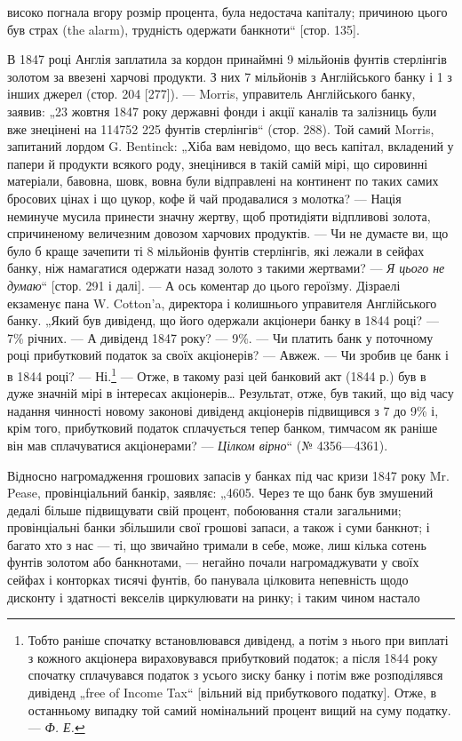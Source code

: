 \parcont{}  %
високо погнала вгору розмір процента, була недостача капіталу;
причиною цього був страх (the alarm), трудність одержати банкноти“ [стор. 135].

В 1847 році Англія заплатила за кордон принаймні 9 мільйонів фунтів стерлінгів золотом за ввезені
харчові продукти.
З них 7 мільйонів з Англійського банку і 1 з інших джерел
(стор. 204 [277]). — Morris, управитель Англійського банку, заявив:
„23 жовтня 1847 року державні фонди і акції каналів та залізниць
були вже знецінені на 114752 225 фунтів стерлінгів“ (стор. 288).
Той самий Morris, запитаний лордом G. Bentinck: „Хіба вам невідомо, що весь капітал, вкладений у
папери й продукти всякого роду, знецінився в такій самій мірі, що сировинні матеріали,
бавовна, шовк, вовна були відправлені на континент по таких самих
бросових цінах і що цукор, кофе й чай продавалися з молотка? —
Нація неминуче мусила принести значну жертву, щоб протидіяти
відпливові золота, спричиненому величезним довозом харчових
продуктів. — Чи не думаєте ви, що було б краще зачепити ті
8 мільйонів фунтів стерлінгів, які лежали в сейфах банку, ніж
намагатися одержати назад золото з такими жертвами? — \emph{Я цього
не думаю}“ [стор. 291 і далі]. — А ось коментар до цього героїзму. Дізраелі екзаменує пана W.
Cotton’a, директора і колишнього
управителя Англійського банку. „Який був дивіденд, що його
одержали акціонери банку в 1844 році? — 7\% річних. — А дивіденд 1847 року? — 9\%. — Чи платить банк у
поточному році прибутковий податок за своїх акціонерів? — Авжеж. — Чи зробив
це банк і в 1844 році? — Ні.\footnote{
Тобто раніше спочатку встановлювався дивіденд, а потім з нього при
виплаті з кожного акціонера вираховувався прибутковий податок; а після
1844 року спочатку сплачувався податок з усього зиску банку і потім вже
розподілявся дивіденд „free of Income Tax“ [вільний від прибуткового податку].
Отже, в останньому випадку той самий номінальний процент вищий на суму
податку. — \emph{Ф. Е.}
} — Отже, в такому разі цей банковий
акт (1844 р.) був в дуже значній мірі в інтересах акціонерів\dots{}
Результат, отже, був такий, що від часу надання чинності новому законові дивіденд акціонерів
підвищився з 7 до 9\% і,
крім того, прибутковий податок сплачується тепер банком, тимчасом як раніше він мав сплачуватися
акціонерами? — \emph{Цілком
вірно}“ (№ 4356—4361).

Відносно нагромадження грошових запасів у банках під час
кризи 1847 року Mr. Pease, провінціальний банкір, заявляє: „4605.
Через те що банк був змушений дедалі більше підвищувати
свій процент, побоювання стали загальними; провінціальні банки
збільшили свої грошові запаси, а також і суми банкнот; і багато хто з нас — ті, що звичайно тримали
в себе, може, лиш
кілька сотень фунтів золотом або банкнотами, — негайно почали нагромаджувати у своїх сейфах і
конторках тисячі фунтів, бо панувала цілковита непевність щодо дисконту і здатності векселів
циркулювати на ринку; і таким чином настало
\parbreak{}  %
